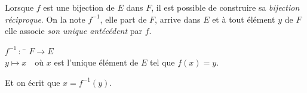 \documentclass[a4paper,12pt,french]{book}
\begin{document}
\begin{exercice}[]
\end{exercice}


\begin{propriete}
Lorsque $f$ est une bijection de $E$ dans $F$, il est possible de construire sa \textit{bijection réciproque}. On la note $f^{-1}$, elle part de $F$, arrive dans $E$ et à tout élément $y$ de $F$ elle associe \textit{son unique antécédent} par $f$.
\begin{center}
\begin{tabbing}
$f^{-1}\,:\,$ \=	$F\longrightarrow E$\\
\>	$y \longmapsto x$\ \ où $x$ est l'unique élément de $E$ tel que $f(x)=y$.
\end{tabbing}
\end{center}
Et on écrit que $x=f^{-1}(y)$.\\
\end{propriete}

\begin{exemple}[]

\end{exemple}
\end{document}
